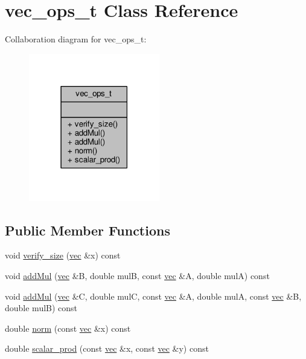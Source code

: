 \hypertarget{classvec__ops__t}{\section{vec\-\_\-ops\-\_\-t Class Reference}
\label{classvec__ops__t}
}


Collaboration diagram for vec\-\_\-ops\-\_\-t\-:\nopagebreak
\begin{figure}[H]
\begin{center}
\leavevmode
\includegraphics[width=162pt]{classvec__ops__t__coll__graph}
\end{center}
\end{figure}
\subsection*{Public Member Functions}
\begin{DoxyCompactItemize}
\item 
void \hyperlink{classvec__ops__t_af17df64c2856fc437fb91d306cfdf715}{verify\-\_\-size} (\hyperlink{classvec}{vec} \&x) const 
\item 
void \hyperlink{classvec__ops__t_a6795455fce033219fbcd03ab320f4ddc}{add\-Mul} (\hyperlink{classvec}{vec} \&B, double mul\-B, const \hyperlink{classvec}{vec} \&A, double mul\-A) const 
\item 
void \hyperlink{classvec__ops__t_a45e5e26c8a22387a6c41e6f9baceb337}{add\-Mul} (\hyperlink{classvec}{vec} \&C, double mul\-C, const \hyperlink{classvec}{vec} \&A, double mul\-A, const \hyperlink{classvec}{vec} \&B, double mul\-B) const 
\item 
double \hyperlink{classvec__ops__t_ac036b34f65bac8438a7bb8f8d3434b2c}{norm} (const \hyperlink{classvec}{vec} \&x) const 
\item 
double \hyperlink{classvec__ops__t_a99f11fb93dee73993acfb2d4bfcd2b75}{scalar\-\_\-prod} (const \hyperlink{classvec}{vec} \&x, const \hyperlink{classvec}{vec} \&y) const 
\end{DoxyCompactItemize}


